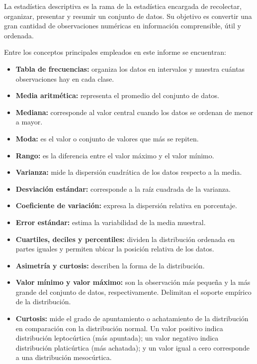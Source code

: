\documentclass[12pt,letterpaper]{article}
\begin{document}
La estadística descriptiva es la rama de la estadística encargada de recolectar, organizar, presentar y resumir un conjunto de datos. Su objetivo es convertir una gran cantidad de observaciones numéricas en información comprensible, útil y ordenada.

Entre los conceptos principales empleados en este informe se encuentran:

\begin{itemize}[leftmargin=1.2cm]
    \item \textbf{Tabla de frecuencias:} organiza los datos en intervalos y muestra cuántas observaciones hay en cada clase.
    \item \textbf{Media aritmética:} representa el promedio del conjunto de datos.
    \item \textbf{Mediana:} corresponde al valor central cuando los datos se ordenan de menor a mayor.
    \item \textbf{Moda:} es el valor o conjunto de valores que más se repiten.
    \item \textbf{Rango:} es la diferencia entre el valor máximo y el valor mínimo.
    \item \textbf{Varianza:} mide la dispersión cuadrática de los datos respecto a la media.
    \item \textbf{Desviación estándar:} corresponde a la raíz cuadrada de la varianza.
    \item \textbf{Coeficiente de variación:} expresa la dispersión relativa en porcentaje.
    \item \textbf{Error estándar:} estima la variabilidad de la media muestral.
    \item \textbf{Cuartiles, deciles y percentiles:} dividen la distribución ordenada en partes iguales y permiten ubicar la posición relativa de los datos.
    \item \textbf{Asimetría y curtosis:} describen la forma de la distribución.
    \item \textbf{Valor mínimo y valor máximo:} son la observación más pequeña y la más grande del conjunto de datos, respectivamente. Delimitan el soporte empírico de la distribución.
    \item \textbf{Curtosis:} mide el grado de apuntamiento o achatamiento de la distribución en comparación con la distribución normal. Un valor positivo indica distribución leptocúrtica (más apuntada); un valor negativo indica distribución platicúrtica (más achatada); y un valor igual a cero corresponde a una distribución mesocúrtica.
\end{itemize}
\end{document}
